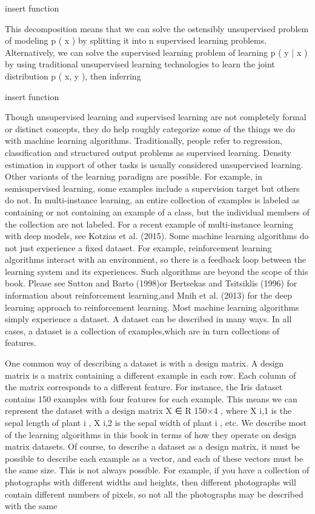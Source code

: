\documentclass[11pt]{article}
\begin{document}
    insert function

This decomposition means that we can solve the ostensibly unsupervised problem of modeling
p
(
x
) by splitting it into
n
supervised learning problems. Alternatively, we
can solve the supervised learning problem of learning
p
(
y | x
) by using traditional
unsupervised learning technologies to learn the joint distribution
p
(
x, y
), then
inferring

    insert function

Though unsupervised learning and supervised learning are not completely formal or distinct concepts, they do help roughly categorize some of the things we do with machine learning algorithms.
Traditionally, people refer to regression, classification and structured output problems as supervised learning.
Density estimation in support of other tasks is usually considered unsupervised learning.
Other variants of the learning paradigm are possible.
For example, in semisupervised learning, some examples include a supervision target but others do not.
In multi-instance learning, an entire collection of examples is labeled as containing or not containing an example of a class, but the individual members of the collection are not labeled.
For a recent example of multi-instance learning with deep models, see Kotzias et al. (2015).
Some machine learning algorithms do not just experience a fixed dataset.
For example, reinforcement learning algorithms interact with an environment, so
there is a feedback loop between the learning system and its experiences. Such
algorithms are beyond the scope of this book.
Please see Sutton and Barto (1998)or Bertsekas and Tsitsiklis (1996) for information about reinforcement learning,and Mnih et al. (2013) for the deep learning approach to reinforcement learning.
Most machine learning algorithms simply experience a dataset.
A dataset can be described in many ways.
In all cases, a dataset is a collection of examples,which are in turn collections of features.

One common way of describing a dataset is with a design matrix. A design
matrix is a matrix containing a diﬀerent example in each row. Each column of the
matrix corresponds to a diﬀerent feature. For instance, the Iris dataset contains
150 examples with four features for each example. This means we can represent
the dataset with a design matrix
X ∈ R
150×4
, where
X
i,1
is the sepal length of
plant
i
,
X
i,2
is the sepal width of plant
i
, etc. We describe most of the learning
algorithms in this book in terms of how they operate on design matrix datasets.
Of course, to describe a dataset as a design matrix, it must be possible to
describe each example as a vector, and each of these vectors must be the same size.
This is not always possible. For example, if you have a collection of photographs
with diﬀerent widths and heights, then diﬀerent photographs will contain diﬀerent
numbers of pixels, so not all the photographs may be described with the same
\end{document}
